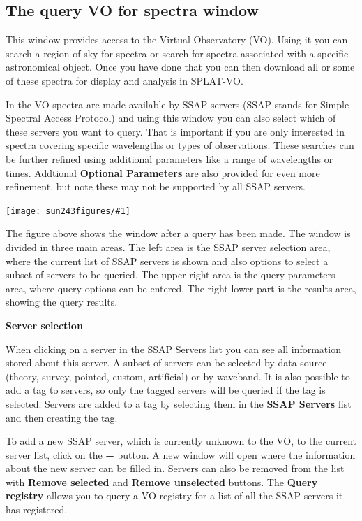 \documentclass[twoside,11pt]{article}
\newcommand{\htmladdimg}[1]{}
\newcommand{\latexhtml}[2]{#1}
\newcommand{\xlabel}[1]{}
\renewcommand{\_}{\texttt{\symbol{95}}}
\newcommand{\SPLAT}{\textsf{SPLAT-VO}}
\newcommand{\clippedmainfigure}[1]
{\begin{center}
 \latexhtml{\texttt{[image: sun243\_figures/\#1]}}{\htmladdimg{#1.gif}}
 \end{center}
}
\newcommand{\labelitem}[1]{\textbf{#1}}
\newcommand{\subheading}[1]{\textbf{\large{#1}}}
\begin{document}
\newpage
\subsection{The query VO for spectra window{\xlabel{ssap_window}}}

This window provides access to the Virtual Observatory (VO). Using it you can
search a region of sky for spectra or search for spectra associated with a
specific astronomical object. Once you have done that you can then download
all or some of these spectra for display and analysis in \SPLAT.

In the VO spectra are made available by SSAP servers (SSAP stands for Simple
Spectral Access Protocol) and using this window you can also select which of
these servers you want to query. That is important if you are only interested
in spectra covering specific wavelengths or types of observations. These
searches can be further refined using additional parameters like a range of
wavelengths or times. Addtional \labelitem{Optional Parameters} are also
provided for even more refinement, but note these may not be supported by all
SSAP servers.

\clippedmainfigure{ssapwindow}

The figure above shows the window after a query has been made.  The window is
divided in three main areas.  The left area is the SSAP server selection area,
where the current list of SSAP servers is shown and also options to select a
subset of servers to be queried. The upper right area is the query parameters
area, where query options can be entered.  The right-lower part is the results
area, showing the query results.

\subheading{Server selection}

When clicking on a server in the SSAP Servers list you can see all information
stored about this server.  A subset of servers can be selected by data source
(theory, survey, pointed, custom, artificial) or by waveband. It is also
possible to add a tag to servers, so only the tagged servers will be queried
if the tag is selected. Servers are added to a tag by selecting them in the
\labelitem{SSAP Servers} list and then creating the tag.

To add a new SSAP server, which is currently unknown to the VO, to the current
server list, click on the \labelitem{+} button. A new window will open where
the information about the new server can be filled in.  Servers can also be
removed from the list with \labelitem{Remove selected} 
and \labelitem{Remove unselected} buttons.  The \labelitem{Query registry} 
allows you to query a VO registry for a list of all the SSAP servers it
has registered.
\end{document}
